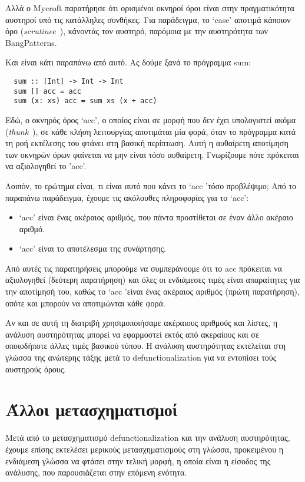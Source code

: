 \documentclass[diploma]{softlab-thesis}
\begin{document}
Αλλά ο Mycroft παρατήρησε ότι ορισμένοι οκνηροί όροι είναι στην
πραγματικότητα αυστηροί υπό τις κατάλληλες συνθήκες. Για παράδειγμα,
το `case' αποτιμά κάποιον όρο (\emph{scrutinee}~\cite{PeytonJones94}),
κάνοντάς τον αυστηρό, παρόμοια με την αυστηρότητα των BangPatterns.

Και είναι κάτι παραπάνω από αυτό. Ας δούμε ξανά το πρόγραμμα sum:
\begin{verbatim}
  sum :: [Int] -> Int -> Int
  sum [] acc = acc
  sum (x: xs) acc = sum xs (x + acc)
\end{verbatim}

Εδώ, ο οκνηρός όρος `acc', ο οποίος είναι σε μορφή που δεν έχει
υπολογιστεί ακόμα (\emph{thunk}~\cite{Bloss1988}), σε κάθε κλήση
λειτουργίας αποτιμάται μία φορά, όταν το πρόγραμμα κατά τη ροή
εκτέλεσης του φτάνει στη βασική περίπτωση. Αυτή η αυθαίρετη αποτίμηση
των οκνηρών όρων φαίνεται να μην είναι τόσο αυθαίρετη. Γνωρίζουμε πότε
πρόκειται να αξιολογηθεί το 'acc'.

Λοιπόν, το ερώτημα είναι, τι είναι αυτό που κάνει το `acc 'τόσο προβλέψιμο;
Από το παραπάνω παράδειγμα, έχουμε τις ακόλουθες πληροφορίες για το `acc':
\begin{itemize}
  \item `acc' είναι ένας ακέραιος αριθμός, που πάντα προστίθεται σε έναν άλλο ακέραιο αριθμό.
  \item `acc' είναι το αποτέλεσμα της συνάρτησης.
\end{itemize}

Από αυτές τις παρατηρήσεις μπορούμε να συμπεράνουμε ότι το acc πρόκειται να αξιολογηθεί 
(δεύτερη παρατήρηση) και όλες οι ενδιάμεσες τιμές είναι απαραίτητες για την αποτίμησή του, καθώς 
το `acc 'είναι ένας ακέραιος αριθμός (πρώτη παρατήρηση), οπότε και μπορούν να αποτιμώνται κάθε φορά.

Αν και σε αυτή τη διατριβή χρησιμοποιήσαμε ακέραιους αριθμούς και λίστες, η ανάλυση αυστηρότητας 
μπορεί να εφαρμοστεί εκτός από ακεραίους και σε οποιοδήποτε άλλες τιμές βασικού τύπου.
Η ανάλυση αυστηρότητας εκτελείται στη γλώσσα της ανώτερης τάξης μετά το defunctionalization για να 
εντοπίσει τούς αυστηρούς όρους.

\section{Άλλοι μετασχηματισμοί}

Μετά από το μετασχηματισμό defunctionalization και την ανάλυση αυστηρότητας, έχουμε επίσης
εκτελέσει μερικούς μετασχηματισμούς στη γλώσσα, προκειμένου η ενδιάμεση
γλώσσα να φτάσει στην τελική μορφή, η οποία είναι η είσοδος της ανάλυσης, που 
παρουσιάζεται στην επόμενη ενότητα.
\end{document}
